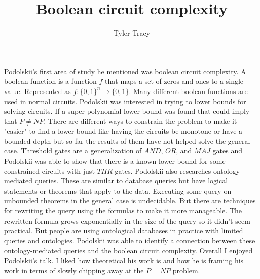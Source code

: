 \documentclass[12pt]{article}
\title{Boolean circuit complexity}
\author{Tyler Tracy}
\begin{document}
Podolskii's first area of study he mentioned was boolean circuit complexity. A boolean function is a function $f$ that maps a set of zeros and ones to a single value. Represented as $f: \{0,1\}^n \rightarrow \{0,1\}$. Many different boolean functions are used in normal circuits. Podolskii was interested in trying to lower bounds for solving circuits. If a super polynomial lower bound was found that could imply that $P \neq NP$. There are different ways to constrain the problem to make it "easier" to find a lower bound like having the circuits be monotone or have a bounded depth but so far the results of them have not helped solve the general case. Threshold gates are a generalization of $AND$, $OR$, and $MAJ$ gates and Podolskii was able to show that there is a known lower bound for some constrained circuits with just $THR$ gates. Podolskii also researches ontology-mediated queries. These are similar to database queries but have logical statements or theorems that apply to the data. Executing some query on unbounded theorems in the general case is undecidable. But there are techniques for rewriting the query using the formulas to make it more manageable. The rewritten formula grows exponentially in the size of the query so it didn't seem practical. But people are using ontological databases in practice with limited queries and ontologies. Podolskii was able to identify a connection between these ontology-mediated queries and the boolean circuit complexity. Overall I enjoyed Podolskii's talk. I liked how theoretical his work is and how he is framing his work in terms of slowly chipping away at the $P = NP$ problem.
\end{document}
